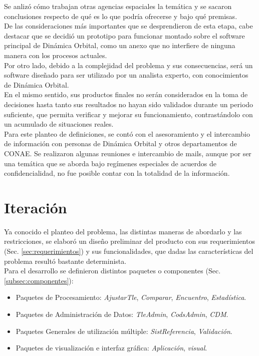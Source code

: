 Se anliz\'o c\'omo trabajan otras agencias espaciales la tem\'atica y se sacaron conclusiones respecto de qu\'e es lo que podr\'ia ofrecerse y bajo qu\'e premisas.\\
De las consideraciones m\'as importantes que se desprendieron de esta etapa, cabe destacar que se decidi\'o un prototipo para funcionar montado sobre el software principal de Din\'amica Orbital, como un anexo que no interfiere de ninguna manera con los procesos actuales.\\
Por otro lado, debido a la complejidad del problema y sus consecuencias, ser\'a un software diseñado para ser utilizado por un analista experto, con conocimientos de Din\'amica Orbital.\\
En el mismo sentido, sus productos finales no ser\'an considerados en la toma de decisiones hasta tanto sus resultados no hayan sido validados durante un periodo suficiente, que permita verificar y mejorar su funcionamiento, contrast\'andolo con un acumulado de situaciones reales.\\

Para este planteo de definiciones, se cont\'o con el asesoramiento y el intercambio de informaci\'on con personas de Din\'amica Orbital y otros departamentos de CONAE. Se realizaron algunas reuniones e intercambio de mails, aunque por ser una tem\'atica que se aborda bajo reg\'imenes especiales de acuerdos de confidencialidad, no fue posible contar con la totalidad de la informaci\'on.

\section{Iteraci\'on}
Ya conocido el planteo del problema, las distintas maneras de abordarlo y las restricciones, se elabor\'o un diseño preliminar del producto con sus requerimientos (Sec. \ref{sec:requerimientos}) y sus funcionalidades, que dadas las caracter\'isticas del problema result\'o bastante determinista.\\

Para el desarrollo se definieron distintos paquetes o componentes (Sec. \ref{subsec:componentes}):\\

\begin{itemize}
\itemsep0em
 \item Paquetes de Procesamiento: {\it{AjustarTle}}, {\it{Comparar}}, {\it{Encuentro}}, {\it{Estad\'istica}}.
 \item Paquetes de Administraci\'on de Datos: {\it{TleAdmin}}, {\it{CodsAdmin}}, {\it{CDM}}.
 \item Paquetes Generales de utilizaci\'on m\'ultiple: {\it{SistReferencia}}, {\it{Validaci\'on}}.
 \item Paquetes de visualizaci\'on e interfaz gr\'afica: {\it{Aplicaci\'on}}, {\it{visual}}.
\end{itemize}

